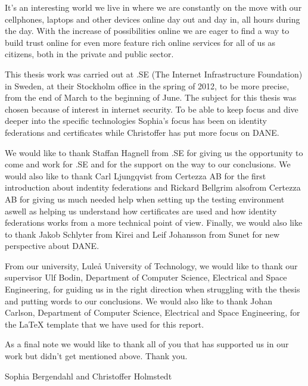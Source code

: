 It's an interesting world we live in where we are constantly on the move with our cellphones, laptops and other devices online day out and day in, all hours during the day.
With the increase of possibilities online we are eager to find a way to build trust online for even more feature rich online services for all of us as citizens, both in the private and public sector.

This thesis work was carried out at .SE (The Internet Infrastructure Foundation) in Sweden, at their Stockholm office in the spring of 2012, to be more precise, from the end of March to the beginning of June.
The subject for this thesis was chosen because of interest in internet security.
To be able to keep focus and dive deeper into the specific technologies Sophia's focus has been on identity federations and certificates while Christoffer has put more focus on DANE.

We would like to thank Staffan Hagnell from .SE for giving us the opportunity to come and work for .SE and for the support on the way to our conclusions.
We would also like to thank Carl Ljungqvist from Certezza AB for the first introduction about indentity federations and Rickard Bellgrim alsofrom Certezza AB for giving us much needed help when setting up the testing environment aswell as helping us understand how certificates are used and how identity federations works from a more technical point of view.
Finally, we would also like to thank Jakob Schlyter from Kirei and Leif Johansson from Sunet for new perspective about DANE.

From our university, Lule\r{a} University of Technology, we would like to thank our supervisor Ulf Bodin, Department of Computer Science, Electrical and Space Engineering, for guiding us in the right direction when struggling with the thesis and putting words to our conclusions.
We would also like to thank Johan Carlson, Department of Computer Science, Electrical and Space Engineering, for the LaTeX template that we have used for this report. 

As a final note we would like to thank all of you that has supported us in our work but didn't get mentioned above.
Thank you.




%



\vspace*{2cm}%
\hfill Sophia Bergendahl and Christoffer Holmstedt
